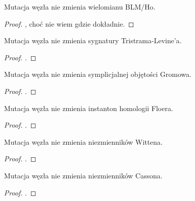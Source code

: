 \begin{proposition}
    Mutacja węzła nie zmienia wielomianu BLM/Ho.
\end{proposition}

\begin{proof}
    \cite{tanaka09}, choć nie wiem gdzie dokładnie.
\end{proof}

\begin{proposition}
    Mutacja węzła nie zmienia sygnatury Tristrama-Levine'a.
\end{proposition}

\begin{proof}
    \cite{cooper99}.
\end{proof}

\begin{proposition}
    \label{mutants_the_same_volume}
    Mutacja węzła nie zmienia symplicjalnej objętości Gromowa.
\end{proposition}

\begin{proof}
    \cite{ruberman87}.
\end{proof}

\begin{proposition}
    Mutacja węzła nie zmienia instanton homologii Floera.
\end{proposition}

\begin{proof}
    \cite{ruberman99}.
\end{proof}

\begin{proposition}
    Mutacja węzła nie zmienia niezmienników Wittena.
\end{proposition}

\begin{proof}
    \cite{rong94}.
\end{proof}

\begin{proposition}
    Mutacja węzła nie zmienia niezmienników Cassona.
\end{proposition}

\begin{proof}
    \cite{kirk89}.
\end{proof}

